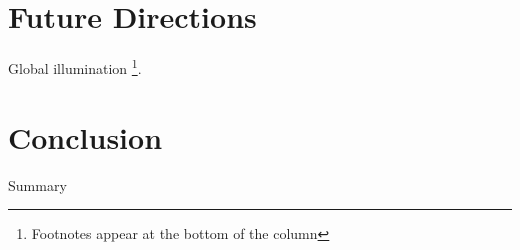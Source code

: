 \documentclass{vgtc}                          %
\begin{document}
\section{Future Directions}
Global illumination \footnote{Footnotes appear at the bottom of the column}. \\

\section{Conclusion}
Summary \\




\end{document}
